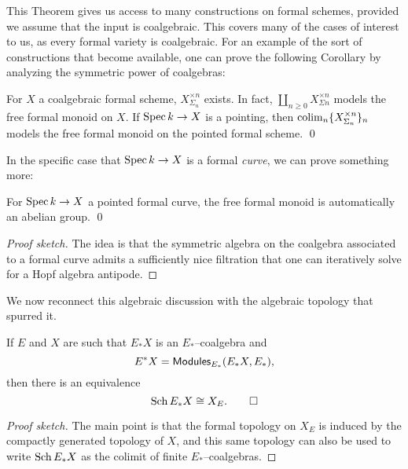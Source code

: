 This Theorem gives us access to many constructions on formal schemes, provided we assume that the input is coalgebraic.  This covers many of the cases of interest to us, as every formal variety is coalgebraic.  For an example of the sort of constructions that become available, one can prove the following Corollary by analyzing the symmetric power of coalgebras:

\begin{corollary}
For $X$ a coalgebraic formal scheme, $X^{\times n}_{\Sigma_n}$ exists.  In fact, $\coprod_{n \ge 0} X^{\times n}_{\Sigma n}$ models the free formal monoid on $X$.  If $\operatorname{Spec} k \to X$ is a pointing, then $\operatorname*{colim}_n \{X^{\times n}_{\Sigma_n}\}_n$ models the free formal monoid on the pointed formal scheme. \qed
\end{corollary}

In the specific case that $\operatorname{Spec} k \to X$ is a formal \emph{curve}, we can prove something more:
\begin{corollary}
For $\operatorname{Spec} k \to X$ a pointed formal curve, the free formal monoid is automatically an abelian group. \qed
\end{corollary}
\begin{proof}[Proof sketch]
The idea is that the symmetric algebra on the coalgebra associated to a formal curve admits a sufficiently nice filtration that one can iteratively solve for a Hopf algebra antipode.
\end{proof}

We now reconnect this algebraic discussion with the algebraic topology that spurred it.

\begin{lemma}
If $E$ and $X$ are such that $E_* X$ is an $E_*$--coalgebra and \[E^* X = \mathsf{Modules}_{E_*}(E_* X, E_*),\] then there is an equivalence \[\operatorname{Sch} E_* X \cong X_E. \qed\]
\end{lemma}
\begin{proof}[Proof sketch]
The main point is that the formal topology on $X_E$ is induced by the compactly generated topology of $X$, and this same topology can also be used to write $\operatorname{Sch} E_* X$ as the colimit of finite $E_*$--coalgebras.
\end{proof}

